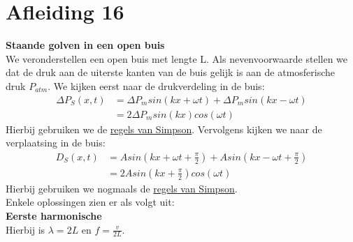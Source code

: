 \documentclass[a4paper,kul]{kulakarticle} %
\begin{document}
\section{Afleiding 16}
\textbf{Staande golven in een open buis}\\
We veronderstellen een open buis met lengte L. Als nevenvoorwaarde stellen we dat de druk aan de uiterste kanten van de buis gelijk is aan de atmosferische druk $P_{atm}$. We kijken eerst naar de drukverdeling in de buis:
\begin{align*}
	\Delta P_S (x,t) &= \Delta P_m sin(kx+\omega t) + \Delta P_m sin(kx-\omega t)\\
	&= 2\Delta P_m sin(kx)cos(\omega t)
\end{align*}
Hierbij gebruiken we de \href{https://nl.wikipedia.org/wiki/Lijst_van_goniometrische_gelijkheden#Som-naar-product-identiteiten_(regels_van_Simpson)}{regels van Simpson}. Vervolgens kijken we naar de verplaatsing in de buis:
\begin{align*}
	D_S(x,t)&=Asin(kx+\omega t+\frac{\pi}{2})+Asin(kx-\omega t+\frac{\pi}{2})\\
	&= 2Asin(kx+\frac{\pi}{2})cos(\omega t)
\end{align*}
Hierbij gebruiken we nogmaals de \href{https://nl.wikipedia.org/wiki/Lijst_van_goniometrische_gelijkheden#Som-naar-product-identiteiten_(regels_van_Simpson)}{regels van Simpson}.\\
Enkele oplossingen zien er als volgt uit:\\

\textbf{Eerste harmonische}\\
Hierbij is $\lambda = 2L$ en $f=\frac{v}{2L}$.
\end{document}
